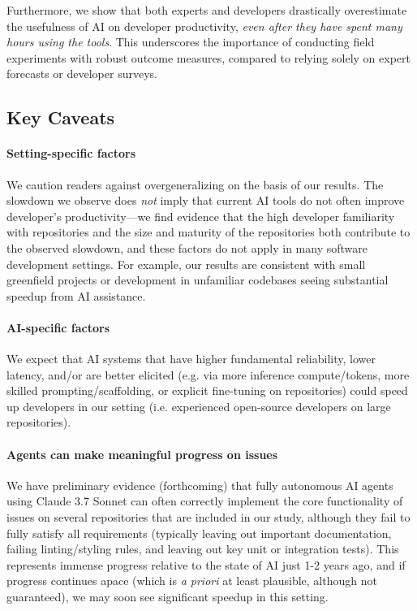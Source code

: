 \documentclass{article}
\begin{document}
Furthermore, we show that both experts and developers drastically overestimate the usefulness of AI on developer productivity, \textit{even after they have spent many hours using the tools}. 
This underscores the importance of conducting field experiments with robust outcome measures, compared to relying solely on expert forecasts or developer surveys.


\subsection{Key Caveats}

\paragraph*{Setting-specific factors}
We caution readers against overgeneralizing on the basis of our results. The slowdown we observe does \textit{not} imply that current AI tools do not often improve developer's productivity---we find evidence that the high developer familiarity with repositories and the size and maturity of the repositories both contribute to the observed slowdown, and these factors do not apply in many software development settings. For example, our results are consistent with small greenfield projects or development in unfamiliar codebases seeing substantial speedup from AI assistance.

\paragraph*{AI-specific factors}
We expect that AI systems that have higher fundamental reliability, lower latency, and/or are better elicited (e.g. via more inference compute/tokens, more skilled prompting/scaffolding, or explicit fine-tuning on repositories) could speed up developers in our setting (i.e. experienced open-source developers on large repositories).

\paragraph*{Agents can make meaningful progress on issues}
We have preliminary evidence (forthcoming) that fully autonomous AI agents using Claude 3.7 Sonnet can often correctly implement the core functionality of issues on several repositories that are included in our study, although they fail to fully satisfy all requirements (typically leaving out important documentation, failing linting/styling rules, and leaving out key unit or integration tests). This represents immense progress relative to the state of AI just 1-2 years ago, and if progress continues apace (which is \textit{a priori} at least plausible, although not guaranteed), we may soon see significant speedup in this setting. 
\end{document}
